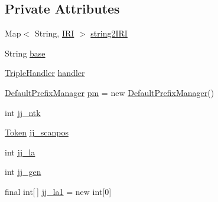 \subsection*{Private Attributes}
\begin{DoxyCompactItemize}
\item 
Map$<$ String, \hyperlink{classorg_1_1semanticweb_1_1owlapi_1_1model_1_1_i_r_i}{I\-R\-I} $>$ \hyperlink{classuk_1_1ac_1_1manchester_1_1cs_1_1owl_1_1owlapi_1_1turtle_1_1parser_1_1_turtle_parser_ae4948aa1de995e3db59660a9c4071590}{string2\-I\-R\-I}
\item 
String \hyperlink{classuk_1_1ac_1_1manchester_1_1cs_1_1owl_1_1owlapi_1_1turtle_1_1parser_1_1_turtle_parser_a1e306b8621c4c1839a9832b031ad3a59}{base}
\item 
\hyperlink{interfaceuk_1_1ac_1_1manchester_1_1cs_1_1owl_1_1owlapi_1_1turtle_1_1parser_1_1_triple_handler}{Triple\-Handler} \hyperlink{classuk_1_1ac_1_1manchester_1_1cs_1_1owl_1_1owlapi_1_1turtle_1_1parser_1_1_turtle_parser_a35cd447f8d345b016012d61f57d4a543}{handler}
\item 
\hyperlink{classorg_1_1semanticweb_1_1owlapi_1_1util_1_1_default_prefix_manager}{Default\-Prefix\-Manager} \hyperlink{classuk_1_1ac_1_1manchester_1_1cs_1_1owl_1_1owlapi_1_1turtle_1_1parser_1_1_turtle_parser_a11201350a9e870208e3c534f5659d58b}{pm} = new \hyperlink{classorg_1_1semanticweb_1_1owlapi_1_1util_1_1_default_prefix_manager}{Default\-Prefix\-Manager}()
\item 
int \hyperlink{classuk_1_1ac_1_1manchester_1_1cs_1_1owl_1_1owlapi_1_1turtle_1_1parser_1_1_turtle_parser_a0265a0e13fe1d4155f6ddc8ae134b9c5}{jj\-\_\-ntk}
\item 
\hyperlink{classuk_1_1ac_1_1manchester_1_1cs_1_1owl_1_1owlapi_1_1turtle_1_1parser_1_1_token}{Token} \hyperlink{classuk_1_1ac_1_1manchester_1_1cs_1_1owl_1_1owlapi_1_1turtle_1_1parser_1_1_turtle_parser_a81013eb1677eddea8a77415343a2ec8e}{jj\-\_\-scanpos}
\item 
int \hyperlink{classuk_1_1ac_1_1manchester_1_1cs_1_1owl_1_1owlapi_1_1turtle_1_1parser_1_1_turtle_parser_ab541820e6c094a36e5bc7f8c2077db94}{jj\-\_\-la}
\item 
int \hyperlink{classuk_1_1ac_1_1manchester_1_1cs_1_1owl_1_1owlapi_1_1turtle_1_1parser_1_1_turtle_parser_a82eb0816c32f6477a37b8edbeb6ae683}{jj\-\_\-gen}
\item 
final int\mbox{[}$\,$\mbox{]} \hyperlink{classuk_1_1ac_1_1manchester_1_1cs_1_1owl_1_1owlapi_1_1turtle_1_1parser_1_1_turtle_parser_aa8e5720d18dd28e6bf2e546b989cee4b}{jj\-\_\-la1} = new int\mbox{[}0\mbox{]}

\end{DoxyCompactItemize}
